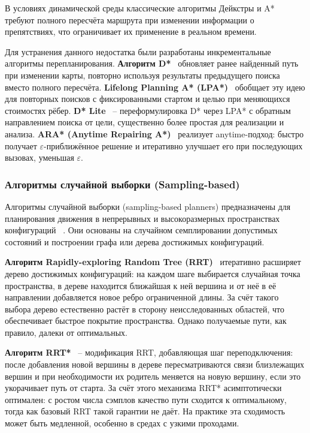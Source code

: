 \documentclass[a4paper,12pt]{extarticle}
\begin{document}
    В условиях динамической среды классические алгоритмы Дейкстры и A* требуют полного пересчёта маршрута
    при изменении информации о препятствиях, что ограничивает их применение в реальном времени.

    Для устранения данного недостатка были разработаны инкрементальные алгоритмы перепланирования.
    \textbf{Алгоритм D*}~\cite{Dstar} обновляет ранее найденный путь при изменении карты, повторно используя результаты предыдущего поиска вместо полного пересчёта.
    \textbf{Lifelong Planning A* (LPA*)}~\cite{lpastar} обобщает эту идею для повторных поисков с фиксированными стартом и целью при меняющихся стоимостях рёбер.
    \textbf{D* Lite}~\cite{dstarlite} -- переформулировка D* через LPA* с обратным направлением поиска от цели, существенно более простая для реализации и анализа.
    \textbf{ARA* (Anytime Repairing A*)}~\cite{arastar} реализует anytime-подход: быстро получает $\varepsilon$-приближённое решение и итеративно улучшает его при последующих вызовах, уменьшая $\varepsilon$.

    \subsubsection{Алгоритмы случайной выборки (Sampling-based)}
    Алгоритмы случайной выборки (sampling-based planners) предназначены для планирования движения в непрерывных и
    высокоразмерных пространствах конфигураций ~\cite{rrtreview}.
    Они основаны на случайном семплировании допустимых состояний и построении графа или дерева достижимых конфигураций.

    \textbf{Алгоритм Rapidly-exploring Random Tree (RRT)}~\cite{rrt} итеративно расширяет дерево достижимых конфигураций: на каждом шаге выбирается случайная точка пространства, в дереве находится ближайшая к ней вершина и от неё в её направлении добавляется новое ребро ограниченной длины.
    За счёт такого выбора дерево естественно растёт в сторону неисследованных областей, что обеспечивает быстрое покрытие пространства.
    Однако получаемые пути, как правило, далеки от оптимальных.

    \textbf{Алгоритм RRT*}~\cite{rrt_star} -- модификация RRT, добавляющая шаг переподключения: после добавления новой вершины в дереве пересматриваются связи близлежащих вершин и при необходимости их родитель меняется на новую вершину, если это укорачивает путь от старта.
    За счёт этого механизма RRT* асимптотически оптимален: с ростом числа сэмплов качество пути сходится к оптимальному, тогда как базовый RRT такой гарантии не даёт.
    На практике эта сходимость может быть медленной, особенно в средах с узкими проходами.
\end{document}
